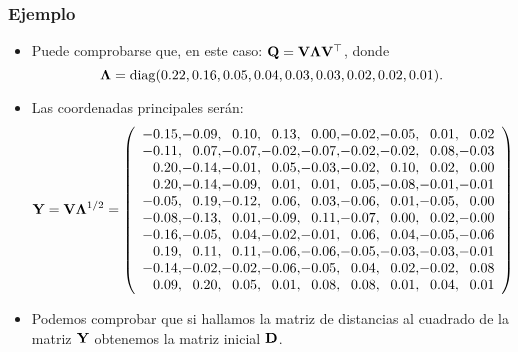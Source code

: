 \begin{frame}
\frametitle{Ejemplo}
\begin{itemize}
\item<2->{Puede comprobarse que, en este caso: $\mathbf{Q}=\mathbf{V}\mathbf{\Lambda}\mathbf{V}^\top$, donde {\small $$\mathbf{\Lambda}={\rm diag}(0.22,  0.16,  0.05,  0.04,  0.03,  0.03,  0.02,  0.02,  0.01).$$}}
\item<3->{Las coordenadas principales serán:
{\tiny 
$$
\vect{Y}=\vect{V}\vect{\Lambda}^{1/2}=\left(\begin{array}{r@{}r@{}r@{}r@{}r@{}r@{}r@{}r@{}r}
-0.15,  &  -0.09,  &  0.10,  &  0.13,  &  0.00,  &  -0.02,  &  -0.05,  &  0.01,  &  0.02 \\
-0.11,  &  0.07,  &  -0.07,  &  -0.02,  &  -0.07,  &  -0.02,  &  -0.02,  &  0.08,  &  -0.03 \\
0.20,  &  -0.14,  &  -0.01,  &  0.05,  &  -0.03,  &  -0.02,  &  0.10,  &  0.02,  &  0.00 \\
0.20,  &  -0.14,  &  -0.09,  &  0.01,  &  0.01,  &  0.05,  &  -0.08,  &  -0.01,  &  -0.01 \\
-0.05,  &  0.19,  &  -0.12,  &  0.06,  &  0.03,  &  -0.06,  &  0.01,  &  -0.05,  &  0.00 \\
-0.08,  &  -0.13,  &  0.01,  &  -0.09,  &  0.11,  &  -0.07,  &  0.00,  &  0.02,  &  -0.00 \\
-0.16,  &  -0.05,  &  0.04,  &  -0.02,  &  -0.01,  &  0.06,  &  0.04,  &  -0.05,  &  -0.06 \\
0.19,  &  0.11,  &  0.11,  &  -0.06,  &  -0.06,  &  -0.05,  &  -0.03,  &  -0.03,  &  -0.01 \\
-0.14,  &  -0.02,  &  -0.02,  &  -0.06,  &  -0.05,  &  0.04,  &  0.02,  &  -0.02,  &  0.08 \\
0.09,  &  0.20,  &  0.05,  &  0.01,  &  0.08,  &  0.08,  &  0.01,  &  0.04,  &  0.01 \\
\end{array}\right)
$$}}
\item<4->{Podemos comprobar que si hallamos la matriz de distancias al cuadrado de la matriz $\mathbf{Y}$ obtenemos la matriz inicial $\mathbf{D}$.}
\end{itemize}
\end{frame}

